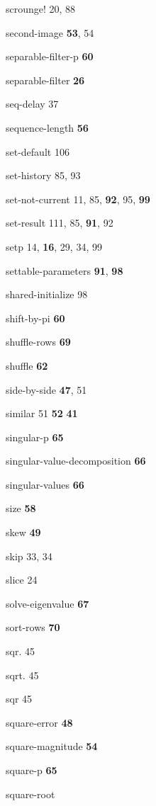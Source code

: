 \begin{theindex}
\item {\ptt scrounge!} 20, 88
\item {\ptt second-image} {\bf 53}, 54
\item {\ptt separable-filter-p} {\bf 60}
\item {\ptt separable-filter} {\bf 26}
\item {\ptt seq-delay} 37
\item {\ptt sequence-length} {\bf 56}
\item {\ptt set-default} 106
\item {\ptt set-history} 85, 93
\item {\ptt set-not-current} 11, 85, {\bf 92}, 95, {\bf 99}
\item {\ptt set-result} 111, 85, {\bf 91}, 92
\item {\ptt setp} 14, {\bf 16}, 29, 34, 99
\item {\ptt settable-parameters} {\bf 91}, {\bf 98}
\item {\ptt shared-initialize} 98
\item {\ptt shift-by-pi} {\bf 60}
\item {\ptt shuffle-rows} {\bf 69}
\item {\ptt shuffle} {\bf 62}
\item {\ptt side-by-side} {\bf 47}, 51
\item {\ptt similar} 51
 {\bf 52}
 {\bf 41}
\item {\ptt singular-p} {\bf 65}
\item {\ptt singular-value-decomposition} {\bf 66}
\item {\ptt singular-values} {\bf 66}
\item {\ptt size}
 {\bf 58}
\item {\ptt skew} {\bf 49}
\item {\ptt skip} 33, 34
\item {\ptt slice} 24
\item {\ptt solve-eigenvalue} {\bf 67}
\item {\ptt sort-rows} {\bf 70}
\item {\ptt sqr.} 45
\item {\ptt sqrt.} 45
\item {\ptt sqr} 45
\item {\ptt square-error} {\bf 48}
\item {\ptt square-magnitude} {\bf 54}
\item {\ptt square-p} {\bf 65}
\item {\ptt square-root}

\end{theindex}
